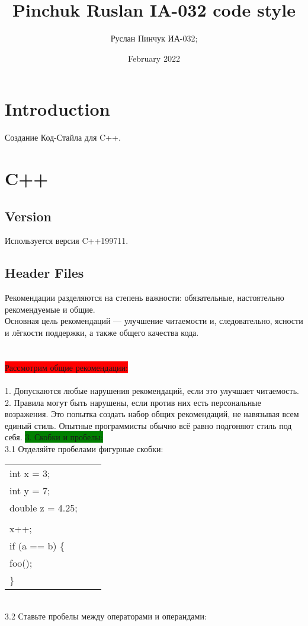 \documentclass{article}
\title{Pinchuk Ruslan IA-032 code style}
\author{Руслан Пинчук ИА-032;}
\affil{SibSUTIS, email: boss.ruslan1212@inbox.ru}
\date{February 2022}
\affil{github: NelicePriyatniy}
\begin{document}
\maketitle

\section{Introduction}
Создание Код-Стайла для C++. 

\section{C++}
\subsection{Version}
Используется версия C++199711.
\subsection{Header Files}
Рекомендации разделяются на степень важности: обязательные, настоятельно рекомендуемые и общие.\\
Основная цель рекомендаций — улучшение читаемости и, следовательно, ясности и лёгкости поддержки, а также общего качества кода.\\
\\\\
\colorbox{red}{Рассмотрим общие рекомендации:} \\
\\
1. Допускаются любые нарушения рекомендаций, если это улучшает читаемость.
\\
2. Правила могут быть нарушены, если против них есть персональные возражения.
Это попытка создать набор общих рекомендаций, не навязывая всем единый стиль. Опытные программисты обычно всё равно подгоняют стиль под себя. 
\newpage
\colorbox{green}{3. Скобки и пробелы:}\\
3.1 Отделяйте пробелами фигурные скобки: \
\begin{tabular}{ | l | l | l | }
\hline
int x = 3;\\
int y = 7;\\
double z = 4.25;\\
\\
x++;\\
if (a == b) \{\\
    foo();\\\} \\
\hline
\end{tabular}
\\
3.2 Ставьте пробелы между операторами и операндами:
\end{document}
